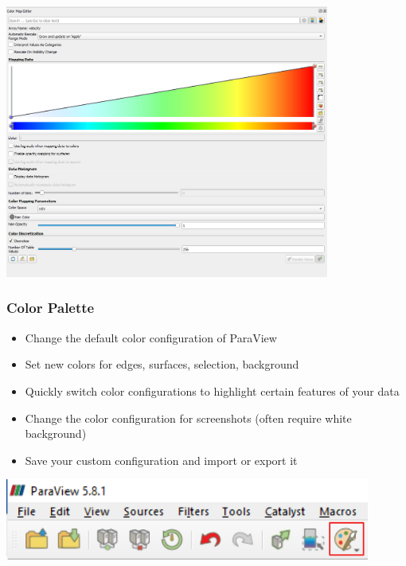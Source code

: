 \begin{frame}
\vspace{-1cm}
  \begin{center}
    \includegraphics[width=0.8\textwidth]{screenshots/color-map-editor.png}
  \end{center}
\end{frame}

\begin{frame}
  \frametitle{Color Palette}
    \begin{itemize}
      \item Change the default color configuration of ParaView
      \item Set new colors for edges, surfaces, selection, background
      \item Quickly switch color configurations to highlight certain features of your data
      \item Change the color configuration for screenshots (often require white background)
      \item Save your custom configuration and import or export it
    \end{itemize}
  \begin{center}
    \includegraphics[width=0.9\textwidth]{screenshots/color-palette-icon.png}
  \end{center}
\end{frame}

